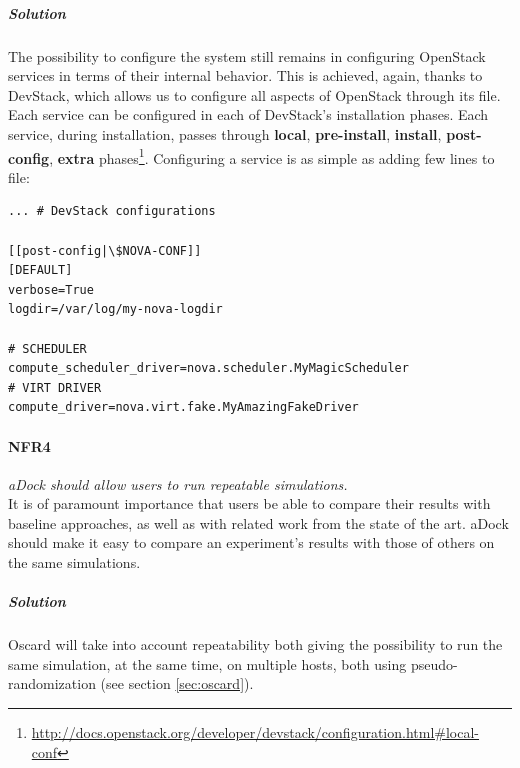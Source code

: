 \subparagraph{Solution} The possibility to configure the system still remains in configuring OpenStack services in terms of their internal behavior. This is achieved, again, thanks to DevStack, which allows us to configure all aspects of OpenStack through its  file. Each service can be configured in each of DevStack's installation phases. Each service, during installation, passes through \textbf{local}, \textbf{pre-install}, \textbf{install}, \textbf{post-config}, \textbf{extra} phases\footnote{\url{http://docs.openstack.org/developer/devstack/configuration.html\#local-conf}}. Configuring a service is as simple as adding few lines to  file:

\begin{lstlisting}[title=Adding per-service configuration to DevStack's local.conf file]
... # DevStack configurations

[[post-config|\$NOVA-CONF]]
[DEFAULT]
verbose=True
logdir=/var/log/my-nova-logdir

# SCHEDULER
compute_scheduler_driver=nova.scheduler.MyMagicScheduler
# VIRT DRIVER
compute_driver=nova.virt.fake.MyAmazingFakeDriver
\end{lstlisting}


\paragraph{NFR4}\label{p:nfr4} \emph{aDock should allow users to run repeatable simulations.} \hfill \\
It is of paramount importance that users be able to compare their results with baseline approaches, as well as with related work from the state of the art. aDock should make it easy to compare an experiment's results with those of others on the same simulations.

\subparagraph{Solution} Oscard will take into account repeatability both giving the possibility to run the same simulation, at the same time, on multiple hosts, both using pseudo-randomization (see section \ref{sec:oscard}).


